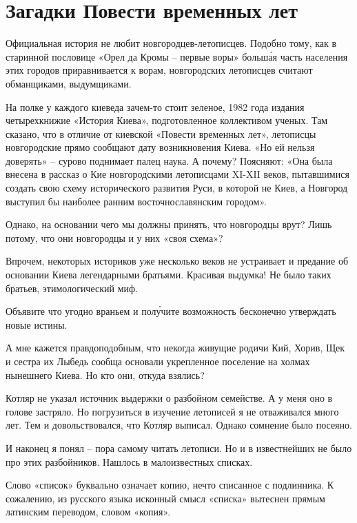 \chapter{Загадки Повести временных лет}

Официальная история не любит новгородцев-летопис\-цев. Подобно тому, как в старинной пословице «Орел да Кромы – первые воры» больш\'ая часть населения этих городов приравнивается к ворам, новгородских летописцев считают обманщиками, выдумщиками.


На полке у каждого киеведа зачем-то стоит зеленое, 1982 года издания четырехкнижие «История Киева», подготовленное коллективом ученых. Там сказано, что в отличие от киевской «Повести временных лет», летописцы новгородские прямо сообщают дату возникновения Киева. «Но ей нельзя доверять» – сурово поднимает палец наука. А почему? Поясняют: «Она была внесена в рассказ о Кие новгородскими летописцами XI-XII веков, пытавшимися создать свою схему исторического развития Руси, в которой не Киев, а Новгород выступил бы наиболее ранним восточнославянским городом».

Однако, на основании чего мы должны принять, что новгородцы врут? Лишь потому, что они новгородцы и у них «своя схема»?

Впрочем, некоторых историков уже несколько веков не устраивает и предание об основании Киева легендарными братьями. Красивая выдумка! Не было таких братьев, этимологический миф.

Объявите что угодно враньем и пол\'учите возможность бесконечно утверждать новые истины.

А мне кажется правдоподобным, что некогда живущие родичи Кий, Хорив, Щек и сестра их Лыбедь сообща основали укрепленное поселение на холмах нынешнего Киева. Но кто они, откуда взялись?

Котляр не указал источник выдержки о разбойном семействе. А у меня оно в голове застряло. Но погрузиться в изучение летописей я не отваживался много лет. Тем и довольствовался, что Котляр выписал. Однако сомнение было посеяно.

И наконец я понял – пора самому читать летописи. Но и в известнейших не было про этих разбойников. Нашлось в малоизвестных списках. 

Слово «список» буквально означает копию, нечто списанное с подлинника. К сожалению, из русского языка исконный смысл «списка» вытеснен прямым латинским переводом, словом «копия».

